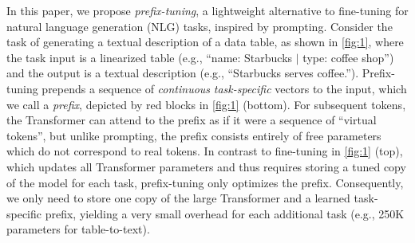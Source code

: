 \documentclass[11pt,a4paper]{article}
\newcommand\pl[1]{\textcolor{red}{[PL: #1]}}
\newcommand\lisa[1]{\textcolor{blue}{[Lisa: #1]}}
\begin{document}
In this paper, we propose \textit{prefix-tuning}, a lightweight alternative to fine-tuning for natural language generation (NLG) tasks, inspired by prompting. 
Consider the task of generating a textual description of a data table, as shown in \cref{fig:1}, where the task input is a linearized table (e.g., ``name: Starbucks $|$ type: coffee shop'') and the output is a textual description (e.g., ``Starbucks serves coffee.''). 
Prefix-tuning prepends a sequence of  \emph{continuous} \emph{task-specific} vectors to the input, which we call a  \emph{prefix}, depicted by red blocks in \cref{fig:1} (bottom).  For subsequent tokens, the Transformer can attend to the prefix as if it were a sequence of ``virtual tokens'', but unlike prompting, the prefix consists entirely  of free parameters which do not correspond to real tokens.
In contrast to fine-tuning in \cref{fig:1} (top), which updates all Transformer 
parameters and thus requires storing a tuned copy of the model for each task, 
prefix-tuning only optimizes the prefix. 
Consequently, we only need to store one copy of the large Transformer and a learned task-specific prefix, yielding a very small overhead for each additional task (e.g., 250K parameters for table-to-text).
\end{document}
